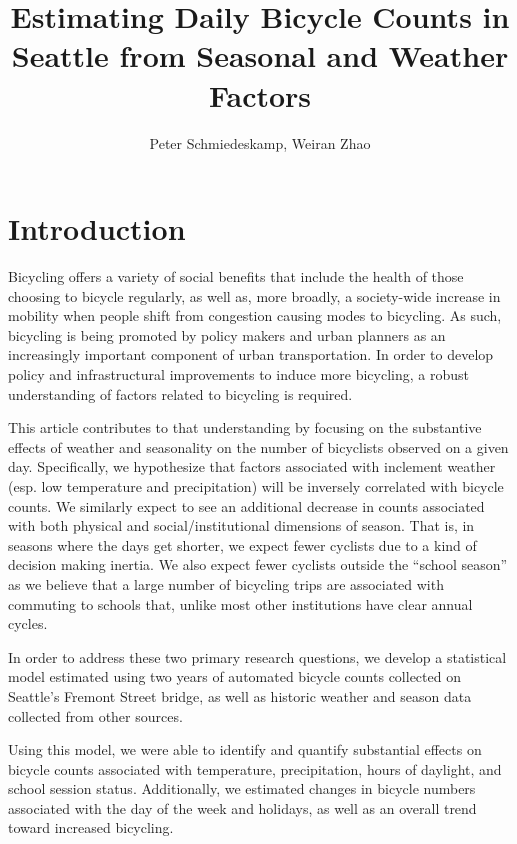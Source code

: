 \documentclass[12pt,letterpaper,article,twocolumn]{memoir}
\title{Estimating Daily Bicycle Counts in Seattle from Seasonal and Weather Factors}
\author{Peter Schmiedeskamp, Weiran Zhao}
\begin{document}
\maketitle

\section*{Introduction}
%
% 

Bicycling offers a variety of social benefits that include the health
of those choosing to bicycle regularly, as well as, more broadly, a
society-wide increase in mobility when people shift from congestion
causing modes to bicycling. As such, bicycling is being promoted by
policy makers and urban planners as an increasingly important
component of urban transportation. In order to develop policy and
infrastructural improvements to induce more bicycling, a robust
understanding of factors related to bicycling is required.

This article contributes to that understanding by focusing on the
substantive effects of weather and seasonality on the number of
bicyclists observed on a given day. Specifically, we hypothesize that
factors associated with inclement weather (esp. low temperature and
precipitation) will be inversely correlated with bicycle counts. We
similarly expect to see an additional decrease in counts associated
with both physical and social/institutional dimensions of season. That
is, in seasons where the days get shorter, we expect fewer cyclists
due to a kind of decision making inertia. We also expect fewer
cyclists outside the ``school season'' as we believe that a large
number of bicycling trips are associated with commuting to schools
that, unlike most other institutions have clear annual cycles.

In order to address these two primary research questions, we develop a
statistical model estimated using two years of automated bicycle
counts collected on Seattle's Fremont Street bridge, as well as
historic weather and season data collected from other sources.

Using this model, we were able to identify and quantify substantial
effects on bicycle counts associated with temperature, precipitation,
hours of daylight, and school session status. Additionally, we
estimated changes in bicycle numbers associated with the day of the
week and holidays, as well as an overall trend toward increased
bicycling.
\end{document}
